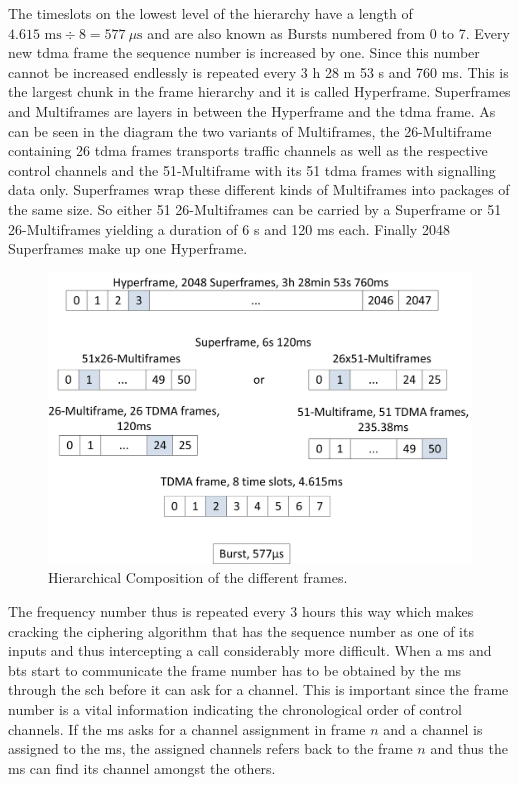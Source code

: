The timeslots on the lowest level of the hierarchy have a length of $4.615\text{ ms} \div 8 = 577~\mu\text{s}$ and are also known as Bursts numbered from 0 to 7.
Every new \gls{tdma} frame the sequence number is increased by one.
Since this number cannot be increased endlessly is repeated every 3 h 28 m 53 s and 760 ms.
This is the largest chunk in the frame hierarchy and it is called Hyperframe.
Superframes and Multiframes are layers in between the Hyperframe and the \gls{tdma} frame.
As can be seen in the diagram the two variants of Multiframes, the 26-Multiframe containing 26 \gls{tdma} frames transports traffic channels as well as the respective control channels and the 51-Multiframe with its 51 \gls{tdma} frames with signalling data only.
Superframes wrap these different kinds of Multiframes into packages of the same size.
So either 51 26-Multiframes can be carried by a Superframe or 51 26-Multiframes yielding a duration of 6 s and 120 ms each.
Finally 2048 Superframes make up one Hyperframe.

\begin{figure}
	\centering
	\includegraphics{../Images/Frames}
	\caption{Hierarchical Composition of the different frames.}
	\label{fig:frame_hierarchy}
\end{figure}

The frequency number thus is repeated every 3 hours this way which makes cracking the ciphering algorithm that has the sequence number as one of its inputs and thus intercepting a call considerably  more difficult.
When a \gls{ms} and \gls{bts} start to communicate the frame number has to be obtained by the \gls{ms} through the \gls{sch} before it can ask for a channel.
This is important since the frame number is a vital information indicating the chronological order of control channels.
If the \gls{ms} asks for a channel assignment in frame $n$ and a channel is assigned to the \gls{ms}, the assigned channels refers back to the frame $n$ and thus the \gls{ms} can find its channel amongst the others.

